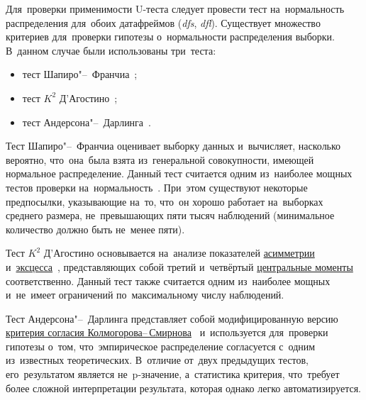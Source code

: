 \documentclass[]{scrreprt}
\begin{document}
Для~проверки применимости U-теста следует провести тест на~нормальность распределения для~обоих датафреймов (\textit{dfs}, \textit{dfl}). Существует множество критериев для~проверки гипотезы о~нормальности распределения выборки. В~данном случае были использованы три~теста:
\begin{itemize}
	\item тест Шапиро"--~Франчиа~\cite{Shapiro-Wilk-test};
	\item тест ${\textstyle K^{2}}$ Д'Агостино~\cite{Agostino-test};
	\item тест Андерсона"--~Дарлинга~\cite{Anderson-Darling-test}.
\end{itemize}
Тест Шапиро"--~Франчиа оценивает выборку данных и~вычисляет, насколько вероятно, что~она~была взята из~генеральной совокупности, имеющей нормальное распределение. Данный тест считается одним из~наиболее мощных тестов проверки на~нормальность~\cite{Kobzarq-prikl-mathstat}. При~этом существуют некоторые предпосылки, указывающие на~то, что~он хорошо работает на~выборках среднего размера, не~превышающих пяти тысяч наблюдений (минимальное количество должно быть не~менее пяти). 

Тест ${\textstyle K^{2}}$ Д'Агостино основывается на~анализе показателей \href{https://en.wikipedia.org/wiki/Skewness}{асимметрии}~\cite{Wiki:skewness} и~\href{https://en.wikipedia.org/wiki/Kurtosis}{эксцесса}~\cite{Wiki:kurtosis}, представляющих собой третий и~четвёртый \href{https://en.wikipedia.org/wiki/Central_moment}{центральные моменты}~\cite{Wiki:central-moment} соответственно. Данный тест также считается одним из~наиболее мощных и~не~имеет ограничений по~максимальному числу наблюдений.

Тест Андерсона"--~Дарлинга представляет собой модифицированную версию \href{Wiki:Kolmogorow-Smirnow-test}{критерия согласия Колмогорова--\,Смирнова}~\cite{Wiki:Kolmogorow-Smirnow-test} и~используется для~проверки гипотезы о~том, что~эмпирическое распределение согласуется с~одним из~известных теоретических. В~отличие от~двух предыдущих тестов, его~результатом является не~p-значение, а~статистика критерия, что~требует более сложной интерпретации результата, которая однако легко автоматизируется.
\end{document}
